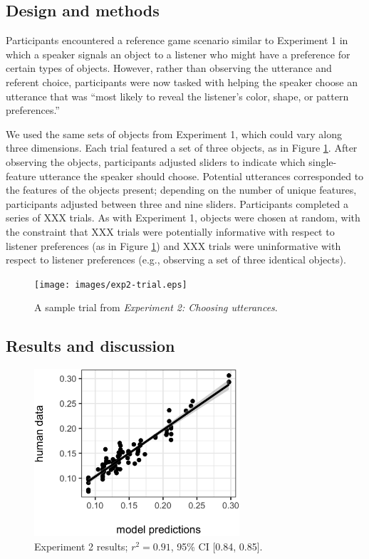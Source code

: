 \documentclass[10pt,a4paper]{article}
\begin{document}
\subsection{Design and methods}

Participants encountered a reference game scenario similar to Experiment 1 in which a speaker signals an object to a listener who might have a preference for certain types of objects. However, rather than observing the utterance and referent choice, participants were now tasked with helping the speaker choose an utterance that was ``most likely to reveal the listener's color, shape, or pattern preferences.''

We used the same sets of objects from Experiment 1, which could vary along three dimensions. Each trial featured a set of three objects, as in Figure \ref{exp2-trial}. After observing the objects, participants adjusted sliders to indicate which single-feature utterance the speaker should choose. Potential utterances corresponded to the features of the objects present; depending on the number of unique features, participants adjusted between three and nine sliders. Participants completed a series of XXX trials. As with Experiment 1, objects were chosen at random, with the constraint that XXX trials were potentially informative with respect to listener preferences (as in Figure \ref{exp2-trial}) and XXX trials were uninformative with respect to listener preferences (e.g., observing a set of three identical objects). 

\begin{figure}[ht]
	\centering
	\texttt{[image: images/exp2-trial.eps]}
	\caption{A sample trial from \emph{Experiment 2: Choosing utterances}.}\label{exp2-trial}
\end{figure}

\subsection{Results and discussion}

\begin{figure}[ht]
	\centering
	\includegraphics[width=3in]{images/X3-scatter-CogSci.eps}
	\caption{Experiment 2 results; $r^{2}=0.91$, 95\% CI [0.84, 0.85].}\label{exp2-results}
\end{figure}
\end{document}
